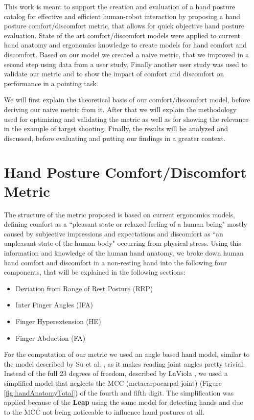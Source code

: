 \documentclass{sig-alternate-05-2015}
\begin{document}
This work is meant to support the creation and evaluation of a hand posture catalog for effective and efficient human-robot interaction by proposing a hand posture comfort/discomfort metric, that allows for quick objective hand posture evaluation. State of the art comfort/discomfort models were applied to current hand anatomy and ergonomics knowledge to create models for hand comfort and discomfort. Based on our model we created a naive metric, that we improved in a second step using data from a user study. Finally another user study was used to validate our metric and to show the impact of comfort and discomfort on performance in a pointing task.

We will first explain the theoretical basis of our comfort/discomfort model, before deriving our naive metric from it. After that we will explain the methodology used for optimizing and validating the metric as well as for showing the relevance in the example of target shooting. Finally, the results will be analyzed and discussed, before evaluating and putting our findings in a greater context.


\section{Hand Posture Comfort/Discomfort Metric}
The structure of the metric proposed is based on current ergonomics models, defining comfort as a ``pleasant state or relaxed feeling of a human being" mostly caused by subjective impressions and expectations and discomfort as ``an unpleasant state of the human body" occurring from physical stress\cite{vink2012editorial}. Using this information and knowledge of the human hand anatomy, we broke down human hand comfort and discomfort in a non-resting hand into the following four components, that will be explained in the following sections: 

\begin{itemize}
	\item Deviation from Range of Rest Posture (RRP)
	\item Inter Finger Angles (IFA)
	\item Finger Hyperextension (HE)
	\item Finger Abduction (FA)
\end{itemize}

For the computation of our metric we used an angle based hand model, similar to the model described by Su et al. \cite{su1994logical}, as it makes reading joint angles pretty trivial. Instead of the full 23 degrees of freedom, described by LaViola \cite{laviola1999survey}, we used a simplified model that neglects the MCC (metacarpocarpal joint) (Figure \ref{fig:handAnatomyTotal}) of the fourth and fifth digit. The simplification was applied because of the \textbf{Leap} using the same model for detecting hands and due to the MCC not being noticeable to influence hand postures at all.
\end{document}
